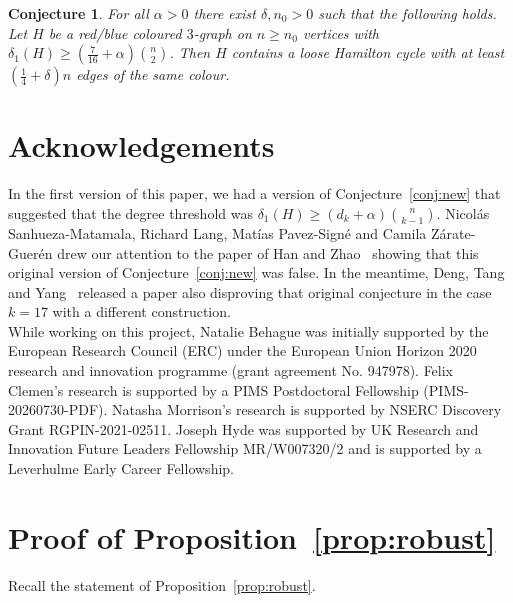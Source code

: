 \documentclass[A4paper,12pt]{article}
\newtheorem{conj}[thm]{Conjecture}
\theoremstyle{definition}
\begin{document}
\begin{conj}\label{conj:final}
    For all $\alpha > 0$ there exist $\delta, n_0 > 0$ such that the following holds. 
    Let $H$ be a red/blue coloured $3$-graph on $n \geq n_0$ vertices with $\delta_1(H) \geq (\frac{7}{16} + \alpha)\binom{n}{2}$. 
    Then $H$ contains a loose Hamilton cycle with at least $(\frac{1}{4} + \delta)n$ edges of the same colour.
\end{conj}




\section{Acknowledgements}
In the first version of this paper, we had a version of Conjecture~\ref{conj:new} that suggested that the degree threshold was $\delta_1(H)\geq (d_k+\alpha)\binom{n}{k-1}$. Nicolás Sanhueza-Matamala, Richard Lang,  Matías  Pavez-Signé and Camila Zárate-Guerén drew our attention to the paper of 
Han and Zhao~\cite{hz16} showing that this original version of Conjecture~\ref{conj:new} was false. In the meantime, Deng, Tang and Yang~\cite{DengTangYang2026} released a paper also disproving that original conjecture in the case $k=17$ with a different construction.\\

While working on this project, Natalie Behague was initially supported by the European Research Council (ERC) under the European Union Horizon 2020 research and innovation programme (grant agreement No. 947978). 
Felix Clemen's research is supported by a PIMS Postdoctoral Fellowship (PIMS-20260730-PDF).
Natasha Morrison's research is supported by NSERC Discovery Grant RGPIN-2021-02511. Joseph Hyde was supported by UK Research and Innovation Future Leaders Fellowship MR/W007320/2 and is supported by a Leverhulme Early Career Fellowship.

 


\appendix{}

\section{Proof of Proposition~\ref{prop:robust}}\label{app:robust}

 Recall the statement of Proposition~\ref{prop:robust}.
\robust*
\end{document}
